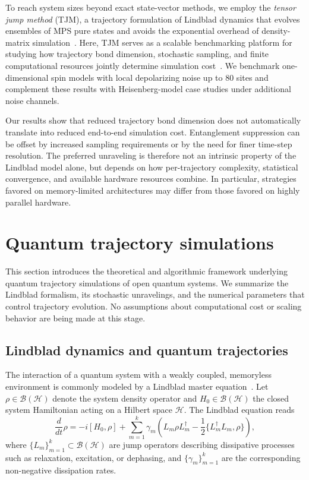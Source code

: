 \documentclass[aps, pra, superscriptaddress, reprint, floatfix]{revtex4-2}
\theoremstyle{plain}
\begin{document}
To reach system sizes beyond exact state-vector methods, we employ the \emph{tensor jump method} (TJM), a trajectory formulation of Lindblad dynamics that evolves ensembles of MPS pure states and avoids the exponential overhead of density-matrix simulation~\cite{sander_TJM_2025}. Here, TJM serves as a scalable benchmarking platform for studying how trajectory bond dimension, stochastic sampling, and finite computational resources jointly determine simulation cost~\cite{daley_2014, transchel_2014, weimer_2021, moroder_2023, zwolak_2004}. We benchmark one-dimensional spin models with local depolarizing noise up to 80 sites and complement these results with Heisenberg-model case studies under additional noise channels.

Our results show that reduced trajectory bond dimension does not automatically translate into reduced end-to-end simulation cost. Entanglement suppression can be offset by increased sampling requirements or by the need for finer time-step resolution. The preferred unraveling is therefore not an intrinsic property of the Lindblad model alone, but depends on how per-trajectory complexity, statistical convergence, and available hardware resources combine. In particular, strategies favored on memory-limited architectures may differ from those favored on highly parallel hardware.

\section{Quantum trajectory simulations}
This section introduces the theoretical and algorithmic framework underlying quantum trajectory simulations of open quantum systems. We summarize the Lindblad formalism, its stochastic unravelings, and the numerical parameters that control trajectory evolution. No assumptions about computational cost or scaling behavior are being made at this stage.

\subsection{Lindblad dynamics and quantum trajectories}
The interaction of a quantum system with a weakly coupled, memoryless environment is commonly modeled by a Lindblad master equation~\cite{Lindblad1976, Breuer_2007}. Let $\rho \in \mathcal{B}(\mathcal{H})$ denote the system density operator and $H_0 \in \mathcal{B}(\mathcal{H})$ the closed system Hamiltonian acting on a Hilbert space $\mathcal{H}$. The Lindblad equation reads
\begin{equation}
\label{eq:Lindblad}
\frac{d}{dt}\rho
= -i[H_0,\rho]
+ \sum_{m=1}^k \gamma_m
\left(
L_m \rho L_m^\dagger
- \frac{1}{2}\{L_m^\dagger L_m, \rho\}
\right),
\end{equation}
where $\{L_m\}_{m=1}^k \subset \mathcal{B}(\mathcal{H})$ are jump operators describing dissipative processes such as relaxation, excitation, or dephasing, and $\{\gamma_m\}_{m=1}^k$ are the corresponding non-negative dissipation rates.
\end{document}
